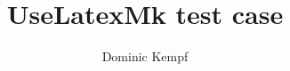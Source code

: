 \documentclass[a4paper,10pt]{article}
\title{UseLatexMk test case}
\author{Dominic Kempf}
\begin{document}
\maketitle

\blindtext{}
\end{document}

